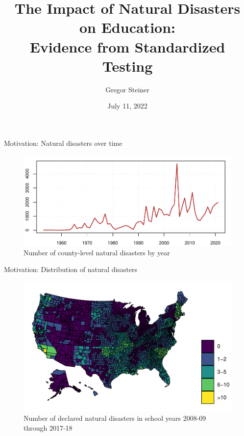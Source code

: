\documentclass[hyperref={colorlinks = true,linkcolor = blue, citecolor=blue,urlcolor=blue}]{beamer}
\title{The Impact of Natural Disasters on Education: \\ Evidence from Standardized Testing}
\author{Gregor Steiner}
\date{July 11, 2022}
\begin{document}
		
\begin{frame}[plain]
    \maketitle
\end{frame}

\begin{frame}{Motivation: Natural disasters over time}
	\begin{figure}[!h]
		\centering
		\includegraphics[scale=0.7]{"../Code & Data/DisasterCount.pdf"}
		\caption{Number of county-level natural disasters by year}
		\label{DisasterCount}
	\end{figure}
\end{frame}

\begin{frame}{Motivation: Distribution of natural disasters}
	\begin{figure}[!h]
		\centering
		\includegraphics[scale=0.65]{"../Code & Data/DisasterMap.pdf"}
		\caption{Number of declared natural disasters in school years 2008-09 through 2017-18}
		\label{DisasterMap}
	\end{figure}
\end{frame}
\end{document}
